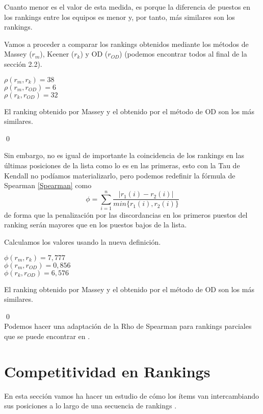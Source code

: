 Cuanto menor es el valor de esta medida, es porque la diferencia de puestos en los rankings entre los equipos  es menor y, por tanto, más similares son los rankings.
\begin{ejem} Vamos a proceder a comparar los rankings obtenidos mediante los métodos de Massey ($r_{m}$), Keener ($r_{k}$) y OD ($r_{OD}$) (podemos encontrar todos al final de la sección 2.2).
\end{ejem}
	\begin{center}
		$ \rho (r_{m},r_{k}) = 38$\\
		$ \rho (r_{m},r_{OD}) = 6$\\
		$ \rho (r_{k},r_{OD}) = 32$
	\end{center}
	
	El ranking obtenido por Massey y el obtenido por el método de OD son los más similares.
	
\qed

Sin embargo, no es igual de importante la coincidencia de los rankings en las últimas posiciones de la lista como lo es en las primeras, esto con la Tau de Kendall no podíamos materializarlo, pero podemos redefinir la fórmula de Spearman \ref{Spearman} como 
\begin{equation}
	\phi = \sum_{i=1}^{n} \dfrac{|r_{1}(i) - r_{2}(i)|}{min\{r_{1}(i),r_{2}(i)\}}
\end{equation}
de forma que la penalización por las discordancias en los primeros puestos del ranking serán mayores que en los puestos bajos de la lista. 

\begin{ejem} Calculamos los valores usando la nueva definición.
\end{ejem}	
	\begin{center}
		$ \phi (r_{m},r_{k}) = 7,777$\\
		$ \phi (r_{m},r_{OD}) = 0,856$\\
		$ \phi (r_{k},r_{OD}) = 6,576$ 
	\end{center}
	
	El ranking obtenido por Massey y el obtenido por el método de OD son los más similares.
	
\qed
\ \\
Podemos hacer una adaptación de la Rho de Spearman para rankings parciales que se puede encontrar en \cite[pág 207-211]{cap16}.

\section{Competitividad en Rankings}
En esta sección vamos ha hacer un estudio de cómo los ítems van intercambiando sus posiciones a lo largo de una secuencia de rankings \cite{refcomp}.\\

